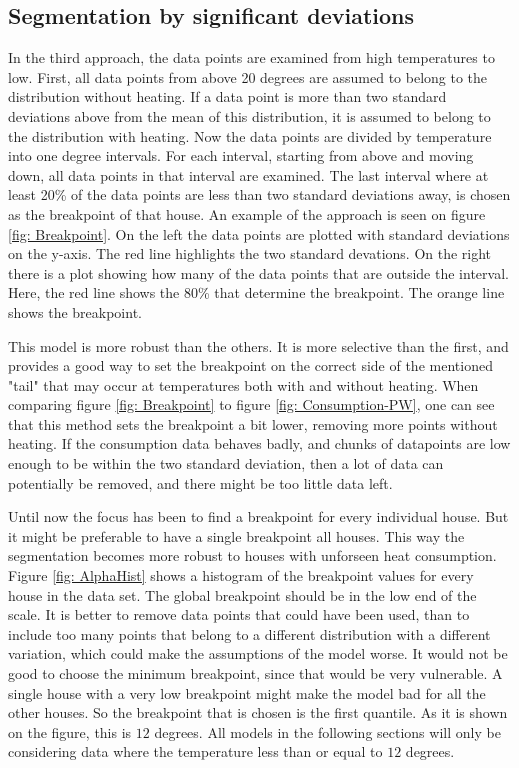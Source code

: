 \subsection{Segmentation by significant deviations}
In the third approach, the data points are examined from high temperatures to low. First, all data points from
above 20 degrees are assumed to belong to the distribution without heating. If a data point is more than two
standard deviations above from the mean of this distribution, it is assumed to belong to the distribution with
heating. Now the data points are divided by temperature into one degree intervals. For each interval, starting
from above and moving down, all data points in that interval are examined. The last interval where at least
20\% of the data points are less than two standard deviations away, is chosen as the breakpoint of that house.
An example of the approach is seen on figure \ref{fig: Breakpoint}. On the left the data points are plotted with
standard deviations on the y-axis. The red line highlights the two standard devations. On the right there is a plot
showing how many of the data points that are outside the interval. Here, the red line shows the 80\% that determine
the breakpoint. The orange line shows the breakpoint.

This model is more robust than the others. It is more selective than the first, and provides a good way to set the
breakpoint on the correct side of the mentioned "tail" that may occur at temperatures both with and without heating.
When comparing figure \ref{fig: Breakpoint} to figure \ref{fig: Consumption-PW}, one can see that this method sets
the breakpoint a bit lower, removing more points without heating. If the consumption data behaves badly, and chunks
of datapoints are low enough to be within the two standard deviation, then a lot of data can potentially be removed,
and there might be too little data left.

Until now the focus has been to find a breakpoint for every individual house. But it might be preferable to have a
single breakpoint all houses. This way the segmentation becomes more robust to houses with unforseen heat consumption.
Figure \ref{fig: AlphaHist} shows a histogram of the breakpoint values for every house in the data set. The global
breakpoint should be in the low end of the scale. It is better to remove data points that could have been used, than
to include too many points that belong to a different distribution with a different variation, which could make the
assumptions of the model worse. It would not be good to choose the minimum breakpoint, since that would be very
vulnerable. A single house with a very low breakpoint might make the model bad for all the other houses. So the
breakpoint that is chosen is the first quantile. As it is shown on the figure, this is $12$ degrees. All models in
the following sections will only be considering data where the temperature less than or equal to $12$ degrees.


